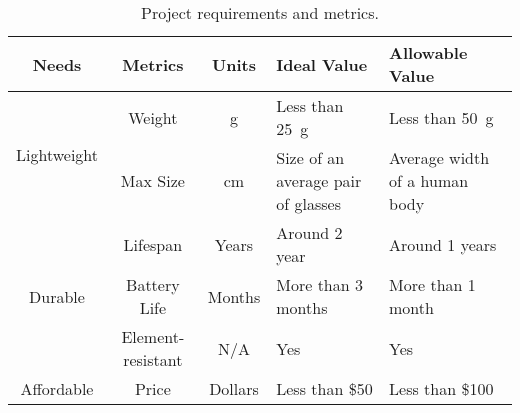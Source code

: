 \begin{table}[H]
  \centering
  \begin{tabular}{| c | c | c | m{10.5em}| m{10.5em} |}\hline
    Needs & Metrics & Units & Ideal Value & Allowable Value\\\hline\hline
    \multirow{2}{*}{Lightweight}
          & Weight & \unit{\g} & Less than \qty{25}{\g} & Less than
                                                          \qty{50}{\g}\\\cline{2-5} 
          & Max Size & \unit{\cm}
                            & Size of an average pair of glasses
                                          & Average width of a human body\\\hline
    \multirow{3}{*}{Durable}
          & Lifespan & Years & Around 2 year & Around 1 years\\\cline{2-5}
          & Battery Life & Months & More than 3 months & More than 1 month\\\cline{2-5}
          & Element-resistant & N/A & Yes & Yes\\\hline
    Affordable & Price & Dollars & Less than \$50 & Less than \$100\\\hline
  \end{tabular}
  
  \caption{Project requirements and metrics.}
\end{table}



